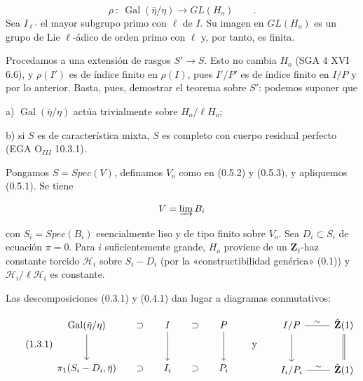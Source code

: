 \begin{equation*}
\rho \ : \ \operatorname{Gal}(\bar\eta/\eta) \longrightarrow GL(H_o) \qquad .
\end{equation*}
Sea $I_{\ell'}$ el mayor subgrupo primo con $\ell$ de $I$. Su imagen en $GL(H_o)$ es un grupo de Lie $\ell$-ádico de orden primo con $\ell$ y, por tanto, es finita.

Procedamos a una extensión de rasgos $S' \longrightarrow S$. Esto no cambia $H_o$ (SGA 4 XVI 6.6), y $\rho(I')$ es de índice finito en $\rho(I)$, pues $I'/P'$ es de índice finito en $I/P$ y por lo anterior. Basta, pues, demostrar el teorema sobre $S'$: podemos suponer que

a) $\operatorname{Gal}(\bar\eta/\eta)$ actúa trivialmente sobre $H_o/\ell H_o$;

b) si $S$ es de característica mixta, $S$ es completo con cuerpo residual perfecto (EGA $\mathrm{O}_{III}$ 10.3.1).

Pongamos $S = Spec(V)$, definamos $V_o$ como en (0.5.2) y (0.5.3), y apliquemos (0.5.1). Se tiene

\begin{equation*}
V = \varinjlim B_i
\end{equation*}


con $S_i = Spec(B_i)$ esencialmente liso y de tipo finito sobre $V_o$. Sea $D_i \subset S_i$ de ecuación $\pi = 0$. Para $i$ suficientemente grande, $H_o$ proviene de un $\mathbf{Z}_\ell$-haz constante torcido $\mathcal{H}_i$ sobre $S_i - D_i$ (por la «constructibilidad genérica» (0.1)) y $\mathcal{H}_i/\ell\mathcal{H}_i$ es constante.

Las descomposiciones (0.3.1) y (0.4.1) dan lugar a diagramas conmutativos:

\begin{equation}\tag{1.3.1}
\begin{tikzcd}[column sep=small, row sep=large]
\mathrm{Gal}(\bar{\eta}/\eta) \arrow[d] & \supset & I \arrow[d] & \supset & P \arrow[d] \\
\pi_1(S_i-D_i,\bar{\eta}) & \supset & I_i & \supset & P_i
\end{tikzcd}
\qquad\text{y}\qquad
\begin{tikzcd}[row sep=large]
I/P \arrow[r, dash, "\sim"] \arrow[d] & \hat{\mathbf{Z}}(1) \arrow[d, equal] \\
I_i/P_i \arrow[r, dash, "\sim"] & \hat{\mathbf{Z}}(1)
\end{tikzcd}
\end{equation}

